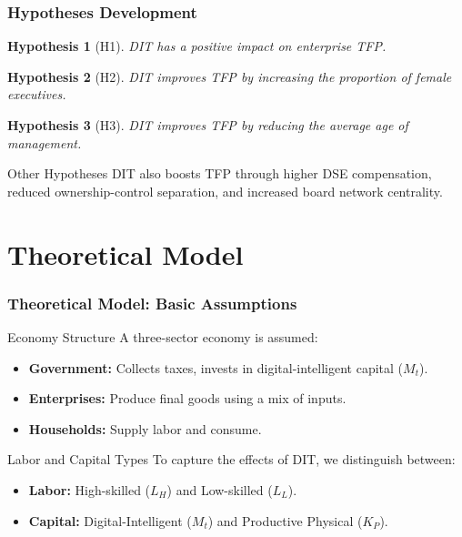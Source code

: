 \documentclass[aspectratio=169]{beamer}
\newtheorem{hypothesis}{Hypothesis}
\begin{document}
\begin{frame}
  \frametitle{Hypotheses Development}
  \begin{hypothesis}[H1]
    DIT has a positive impact on enterprise TFP.
  \end{hypothesis}
  \vfill
  \begin{hypothesis}[H2]
    DIT improves TFP by increasing the proportion of female executives.
  \end{hypothesis}
  \vfill
  \begin{hypothesis}[H3]
    DIT improves TFP by reducing the average age of management.
  \end{hypothesis}
  \vfill
  \pause
  \begin{block}{Other Hypotheses}
  DIT also boosts TFP through higher DSE compensation, reduced ownership-control separation, and increased board network centrality.
  \end{block}
\end{frame}

\section{Theoretical Model}

\begin{frame}
  \frametitle{Theoretical Model: Basic Assumptions}
    \begin{block}{Economy Structure}
        A three-sector economy is assumed:
        \begin{itemize}
            \item \textbf{Government:} Collects taxes, invests in digital-intelligent capital ($M_t$).
            \item \textbf{Enterprises:} Produce final goods using a mix of inputs.
            \item \textbf{Households:} Supply labor and consume.
        \end{itemize}
    \end{block}
    \begin{block}{Labor and Capital Types}
        To capture the effects of DIT, we distinguish between:
        \begin{itemize}
            \item \textbf{Labor:} High-skilled ($L_H$) and Low-skilled ($L_L$).
            \item \textbf{Capital:} Digital-Intelligent ($M_t$) and Productive Physical ($K_P$).
        \end{itemize}
    \end{block}
\end{frame}
\end{document}
